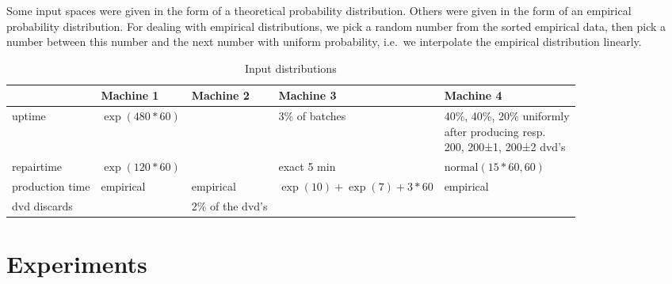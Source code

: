 \documentclass{article}
\begin{document}
Some input spaces were given in the form of a theoretical probability distribution.
Others were given in the form of an empirical probability distribution.
For dealing with empirical distributions, we pick a random number from the sorted empirical data, then pick a number between this number and the next number with uniform probability, i.e.\ we interpolate the empirical distribution linearly.

\begin{table}[h]
    \begin{tabular}{|l|l|l|l|p{4cm}|}
    \hline
                    & Machine 1         & Machine 2         & Machine 3                     & Machine 4 \\ \hline
    uptime          & $\exp(480*60)$    &                   & 3\% of batches                & \parbox{5cm}{40\%, 40\%, 20\% uniformly\\ after producing resp.\\ 200, 200±1, 200±2 dvd's} \\ \hline
    repairtime      & $\exp(120*60)$    &                   & exact 5 min                   & $\mathrm{normal}(15*60, 60)$ \\ \hline
    production time & empirical         & empirical         & $\exp(10) + \exp(7) + 3*60$   & empirical \\ \hline
    dvd discards    &                   & 2\% of the dvd's  &                               & \\ \hline
    \end{tabular}
    \caption {Input distributions}
\end{table}









\section{Experiments}
%
\end{document}
